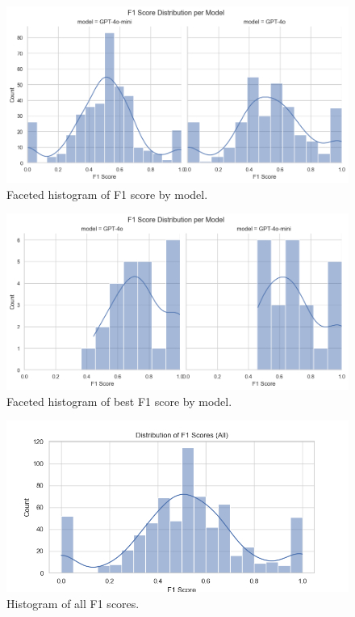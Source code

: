                 \begin{figure}[H]
                    \centering
                    \includegraphics[width=0.75\linewidth]{images_exp2/facet_hist_f1_by_model.png}
                    \caption{Faceted histogram of F1 score by model.}
                    \label{fig:facet_hist_f1_by_model}
                \end{figure}

                \begin{figure}[H]
                    \centering
                    \includegraphics[width=0.75\linewidth]{images_exp2/facet_hist_f1_by_model_best_f1.png}
                    \caption{Faceted histogram of best F1 score by model.}
                    \label{fig:facet_hist_f1_by_model_best_f1}
                \end{figure}

                \begin{figure}[H]
                    \centering
                    \includegraphics[width=0.5\linewidth]{images_exp2/hist_f1_score_all.png}
                    \caption{Histogram of all F1 scores.}
                    \label{fig:hist_f1_score_all}
                \end{figure}

